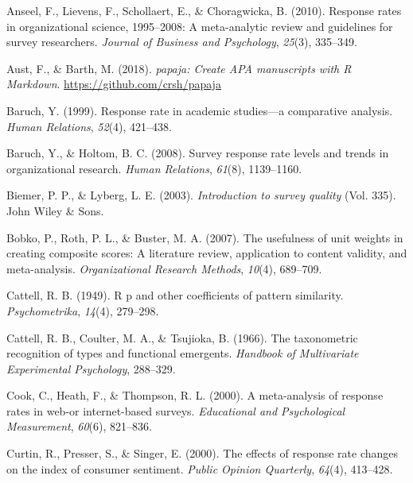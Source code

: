 \documentclass[
  man,mask]{apa7}
\newlength{\cslhangindent}
\newenvironment{CSLReferences}[2] %
 {\begin{list}{}{%
  \setlength{\itemindent}{0pt}
  \setlength{\leftmargin}{0pt}
  \setlength{\parsep}{0pt}
  \ifodd #1
   \setlength{\leftmargin}{\cslhangindent}
   \setlength{\itemindent}{-1\cslhangindent}
  \fi
  \setlength{\itemsep}{#2\baselineskip}}}
 {\end{list}}
\begin{document}
\label{refs}
\begin{CSLReferences}{1}{0}
Anseel, F., Lievens, F., Schollaert, E., \& Choragwicka, B. (2010). Response rates in organizational science, 1995--2008: A meta-analytic review and guidelines for survey researchers. \emph{Journal of Business and Psychology}, \emph{25}(3), 335--349.

Aust, F., \& Barth, M. (2018). \emph{{papaja}: {Create} {APA} manuscripts with {R Markdown}}. \url{https://github.com/crsh/papaja}

Baruch, Y. (1999). Response rate in academic studies---a comparative analysis. \emph{Human Relations}, \emph{52}(4), 421--438.

Baruch, Y., \& Holtom, B. C. (2008). Survey response rate levels and trends in organizational research. \emph{Human Relations}, \emph{61}(8), 1139--1160.

Biemer, P. P., \& Lyberg, L. E. (2003). \emph{Introduction to survey quality} (Vol. 335). John Wiley \& Sons.

Bobko, P., Roth, P. L., \& Buster, M. A. (2007). The usefulness of unit weights in creating composite scores: A literature review, application to content validity, and meta-analysis. \emph{Organizational Research Methods}, \emph{10}(4), 689--709.

Cattell, R. B. (1949). R p and other coefficients of pattern similarity. \emph{Psychometrika}, \emph{14}(4), 279--298.

Cattell, R. B., Coulter, M. A., \& Tsujioka, B. (1966). The taxonometric recognition of types and functional emergents. \emph{Handbook of Multivariate Experimental Psychology}, 288--329.

Cook, C., Heath, F., \& Thompson, R. L. (2000). A meta-analysis of response rates in web-or internet-based surveys. \emph{Educational and Psychological Measurement}, \emph{60}(6), 821--836.

Curtin, R., Presser, S., \& Singer, E. (2000). The effects of response rate changes on the index of consumer sentiment. \emph{Public Opinion Quarterly}, \emph{64}(4), 413--428.


\end{CSLReferences}
\end{document}
